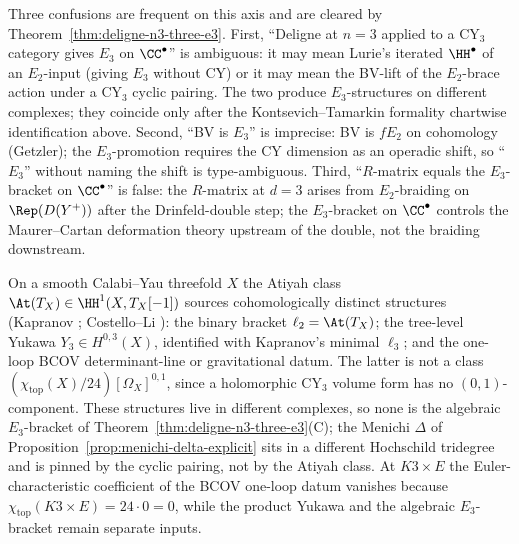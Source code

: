\begin{remark}
\label{rem:deligne-n3-ap-cleared}
Three confusions are frequent on this axis and are cleared by Theorem~\ref{thm:deligne-n3-three-e3}. First, ``Deligne at $n = 3$ applied to a CY$_3$ category gives $E_3$ on $\CC^\bullet$'' is ambiguous: it may mean Lurie's iterated $\HH^\bullet$ of an $E_2$-input (giving $E_3$ without CY) or it may mean the BV-lift of the $E_2$-brace action under a CY$_3$ cyclic pairing. The two produce $E_3$-structures on different complexes; they coincide only after the Kontsevich--Tamarkin formality chartwise identification above. Second, ``BV is $E_3$'' is imprecise: BV is $fE_2$ on cohomology (Getzler); the $E_3$-promotion requires the CY dimension as an operadic shift, so ``$E_3$'' without naming the shift is type-ambiguous. Third, ``$R$-matrix equals the $E_3$-bracket on $\CC^\bullet$'' is false: the $R$-matrix at $d = 3$ arises from $E_2$-braiding on $\Rep(D(Y^+))$ after the Drinfeld-double step; the $E_3$-bracket on $\CC^\bullet$ controls the Maurer--Cartan deformation theory upstream of the double, not the braiding downstream.
\end{remark}

\begin{remark}
\label{rem:three-atiyah-cocycles-qca}
On a smooth Calabi--Yau threefold $X$ the Atiyah class $\At(T_X) \in \HH^1(X, T_X[-1])$ sources cohomologically distinct structures (Kapranov \cite{Kapranov1999}; Costello--Li \cite{CostelloLi2016}): the binary bracket $\ell_2 = \At(T_X)$; the tree-level Yukawa $Y_3 \in H^{0,3}(X)$, identified with Kapranov's minimal $\ell_3$; and the one-loop BCOV determinant-line or gravitational datum.  The latter is not a class \((\chi_{\mathrm{top}}(X)/24)[\Omega_X]^{0,1}\), since a holomorphic CY$_3$ volume form has no \((0,1)\)-component.  These structures live in different complexes, so none is the algebraic $E_3$-bracket of Theorem~\ref{thm:deligne-n3-three-e3}(C); the Menichi $\Delta$ of Proposition~\ref{prop:menichi-delta-explicit} sits in a different Hochschild tridegree and is pinned by the cyclic pairing, not by the Atiyah class. At $K3 \times E$ the Euler-characteristic coefficient of the BCOV one-loop datum vanishes because $\chi_{\mathrm{top}}(K3 \times E) = 24 \cdot 0 = 0$, while the product Yukawa and the algebraic $E_3$-bracket remain separate inputs.
\end{remark}

